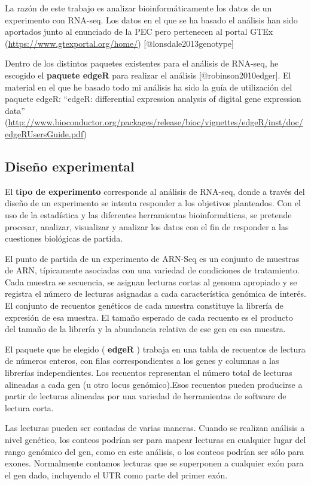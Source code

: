 \documentclass[]{article}
\begin{document}
La razón de este trabajo es analizar bioinformáticamente los datos de un
experimento con RNA-seq. Los datos en el que se ha basado el análisis
han sido aportados junto al enunciado de la PEC pero pertenecen al
portal GTEx (\url{https://www.gtexportal.org/home/})
{[}@lonsdale2013genotype{]}

Dentro de los distintos paquetes existentes para el análisis de RNA-seq,
he escogido el \textbf{paquete edgeR} para realizar el análisis
{[}@robinson2010edger{]}. El material en el que he basado todo mi
análisis ha sido la guía de utilización del paquete edgeR: ``edgeR:
differential expression analysis of digital gene expression data''
(\url{http://www.bioconductor.org/packages/release/bioc/vignettes/edgeR/inst/doc/edgeRUsersGuide.pdf})

\hypertarget{diseuxf1o-experimental}{%
\subsection{Diseño experimental}\label{diseuxf1o-experimental}}

El \textbf{tipo de experimento} corresponde al análisis de RNA-seq,
donde a través del diseño de un experimento se intenta responder a los
objetivos planteados. Con el uso de la estadística y las diferentes
herramientas bioinformáticas, se pretende procesar, analizar, visualizar
y analizar los datos con el fin de responder a las cuestiones biológicas
de partida.

El punto de partida de un experimento de ARN-Seq es un conjunto de
muestras de ARN, típicamente asociadas con una variedad de condiciones
de tratamiento. Cada muestra se secuencia, se asignan lecturas cortas al
genoma apropiado y se registra el número de lecturas asignadas a cada
característica genómica de interés. El conjunto de recuentos genéticos
de cada muestra constituye la librería de expresión de esa muestra. El
tamaño esperado de cada recuento es el producto del tamaño de la
librería y la abundancia relativa de ese gen en esa muestra.

El paquete que he elegido ( \textbf{edgeR} ) trabaja en una tabla de
recuentos de lectura de números enteros, con filas correspondientes a
los genes y columnas a las librerías independientes. Los recuentos
representan el número total de lecturas alineadas a cada gen (u otro
locus genómico).Esos recuentos pueden producirse a partir de lecturas
alineadas por una variedad de herramientas de software de lectura corta.

Las lecturas pueden ser contadas de varias maneras. Cuando se realizan
análisis a nivel genético, los conteos podrían ser para mapear lecturas
en cualquier lugar del rango genómico del gen, como en este análisis, o
los conteos podrían ser sólo para exones. Normalmente contamos lecturas
que se superponen a cualquier exón para el gen dado, incluyendo el UTR
como parte del primer exón.
\end{document}
